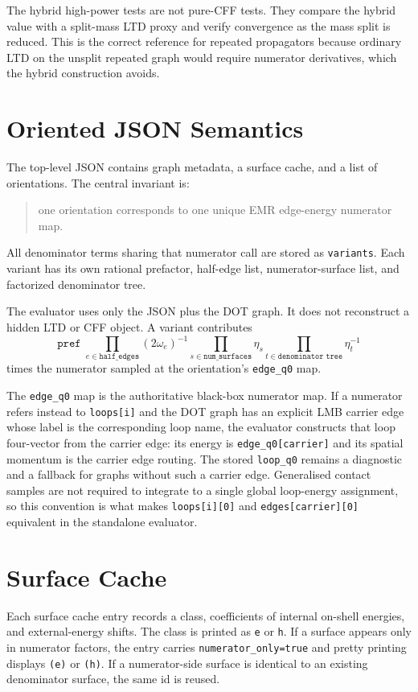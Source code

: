 \documentclass[11pt,a4paper]{report}
\begin{document}
The hybrid high-power tests are not pure-CFF tests.  They compare the hybrid
value with a split-mass LTD proxy and verify convergence as the mass split is
reduced.  This is the correct reference for repeated propagators because
ordinary LTD on the unsplit repeated graph would require numerator
derivatives, which the hybrid construction avoids.

\section{Oriented JSON Semantics}

The top-level JSON contains graph metadata, a surface cache, and a list of
orientations.  The central invariant is:
\begin{quote}
one orientation corresponds to one unique EMR edge-energy numerator map.
\end{quote}
All denominator terms sharing that numerator call are stored as
\texttt{variants}.  Each variant has its own rational prefactor, half-edge
list, numerator-surface list, and factorized denominator tree.

The evaluator uses only the JSON plus the DOT graph.  It does not reconstruct a
hidden LTD or CFF object.  A variant contributes
\[
  \texttt{pref}\;
  \prod_{e\in\texttt{half\_edges}}(2\omega_e)^{-1}
  \prod_{s\in\texttt{num\_surfaces}}\eta_s
  \prod_{t\in\texttt{denominator tree}}\eta_t^{-1}
\]
times the numerator sampled at the orientation's \texttt{edge\_q0} map.

The \texttt{edge\_q0} map is the authoritative black-box numerator map.  If a
numerator refers instead to \texttt{loops[i]} and the DOT graph has an explicit
LMB carrier edge whose label is the corresponding loop name, the evaluator
constructs that loop four-vector from the carrier edge: its energy is
\texttt{edge\_q0[carrier]} and its spatial momentum is the carrier edge routing.
The stored \texttt{loop\_q0} remains a diagnostic and a fallback for graphs
without such a carrier edge.  Generalised contact samples are not required to
integrate to a single global loop-energy assignment, so this convention is what
makes \texttt{loops[i][0]} and \texttt{edges[carrier][0]} equivalent in the
standalone evaluator.

\section{Surface Cache}

Each surface cache entry records a class, coefficients of internal on-shell
energies, and external-energy shifts.  The class is printed as
\texttt{e} or \texttt{h}.  If a surface appears only in numerator factors, the
entry carries \texttt{numerator\_only=true} and pretty printing displays
\texttt{(e)} or \texttt{(h)}.  If a numerator-side surface is identical to an
existing denominator surface, the same id is reused.
\end{document}
